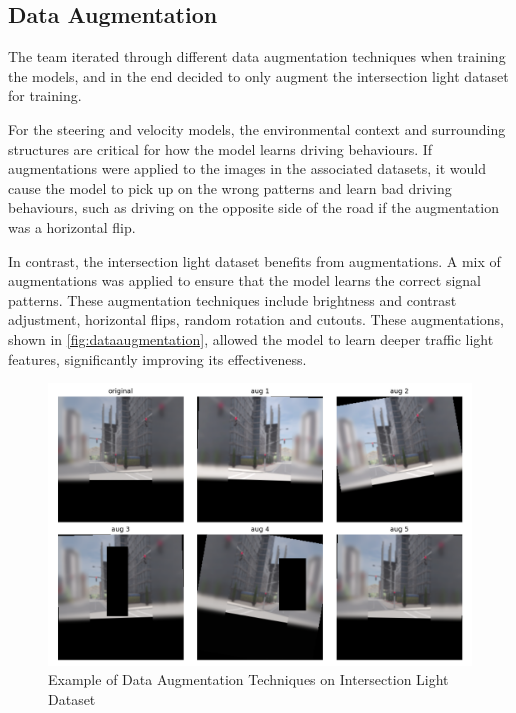 \documentclass{article} %
\begin{document}
\subsection{Data Augmentation}

The team iterated through different data augmentation techniques when training the models, and in the end decided to only augment the intersection light dataset for training.

For the steering and velocity models, the environmental context and surrounding structures are critical for how the model learns driving behaviours. If augmentations were applied to the images in the associated datasets, it would cause the model to pick up on the wrong patterns and learn bad driving behaviours, such as driving on the opposite side of the road if the augmentation was a horizontal flip.

In contrast, the intersection light dataset benefits from augmentations.  A mix of augmentations was applied to ensure that the model learns the correct signal patterns. These augmentation techniques include brightness and contrast adjustment, horizontal flips, random rotation and cutouts. These augmentations, shown in \autoref{fig:dataaugmentation}, allowed the model to learn deeper traffic light features,  significantly improving its effectiveness.

\begin{figure}[H] %
    \centering
    \includegraphics[scale=0.4]{Data Augmentation.png} %
    \caption{Example of Data Augmentation Techniques on Intersection Light Dataset}
    \label{fig:dataaugmentation}
\end{figure}
\end{document}
